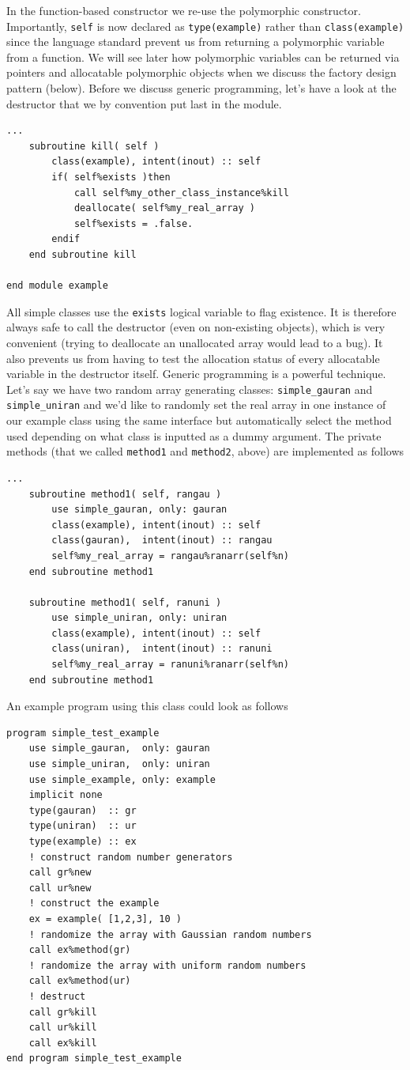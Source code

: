 \documentclass[a4paper,11pt]{article}
\begin{document}
In the function-based constructor we re-use the polymorphic constructor. Importantly, \texttt{self} is now declared as \texttt{type(example)} rather than \texttt{class(example)} since the language standard prevent us from returning a polymorphic variable from a function. We will see later how polymorphic variables can be returned via pointers and allocatable polymorphic objects when we discuss the factory design pattern (below). Before we discuss generic programming, let's have a look at the destructor that we by convention put last in the module.
\begin{verbatim}
...
    subroutine kill( self )
        class(example), intent(inout) :: self
        if( self%exists )then
            call self%my_other_class_instance%kill
            deallocate( self%my_real_array )
            self%exists = .false.
        endif
    end subroutine kill

end module example
\end{verbatim}
All simple classes use the \texttt{exists} logical variable to flag existence. It is therefore always safe to call the destructor (even on non-existing objects), which is very convenient (trying to deallocate an unallocated array would lead to a bug). It also prevents us from having to test the allocation status of every allocatable variable in the destructor itself. Generic programming is a powerful technique. Let's say we have two random array generating classes: \texttt{simple\_gauran} and \texttt{simple\_uniran} and we'd like to randomly set the real array in one instance of our example class using the same interface but automatically select the method used depending on what class is inputted as a dummy argument. The private methods (that we called \texttt{method1} and \texttt{method2}, above) are implemented as follows
\begin{verbatim}
...
    subroutine method1( self, rangau )
        use simple_gauran, only: gauran
        class(example), intent(inout) :: self
        class(gauran),  intent(inout) :: rangau
        self%my_real_array = rangau%ranarr(self%n)
    end subroutine method1

    subroutine method1( self, ranuni )
        use simple_uniran, only: uniran
        class(example), intent(inout) :: self
        class(uniran),  intent(inout) :: ranuni
        self%my_real_array = ranuni%ranarr(self%n)
    end subroutine method1
\end{verbatim}
An example program using this class could look as follows
\begin{verbatim}
program simple_test_example
    use simple_gauran,  only: gauran
    use simple_uniran,  only: uniran
    use simple_example, only: example
    implicit none
    type(gauran)  :: gr
    type(uniran)  :: ur
    type(example) :: ex
    ! construct random number generators
    call gr%new 
    call ur%new
    ! construct the example
    ex = example( [1,2,3], 10 )
    ! randomize the array with Gaussian random numbers
    call ex%method(gr)
    ! randomize the array with uniform random numbers 
    call ex%method(ur)
    ! destruct
    call gr%kill
    call ur%kill
    call ex%kill
end program simple_test_example
\end{verbatim}
\end{document}
